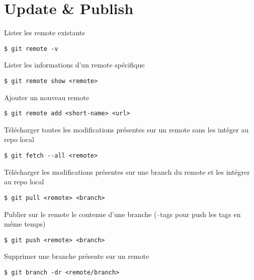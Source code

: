 \section*{Update \& Publish}

Lister les remote existants
\begin{lstlisting}
$ git remote -v
\end{lstlisting} 
Lister les informations d'un remote spécifique
\begin{lstlisting}
$ git remote show <remote>
\end{lstlisting}
Ajouter un nouveau remote
\begin{lstlisting}
$ git remote add <short-name> <url>
\end{lstlisting}
Télécharger toutes les modifications présentes sur un remote sans les intéger au repo local
\begin{lstlisting}
$ git fetch --all <remote>
\end{lstlisting}
Télécharger les modifications présentes sur une branch du remote et les intégrer au repo local
\begin{lstlisting}
$ git pull <remote> <branch>
\end{lstlisting}
Publier sur le remote le contenue d'une branche (--tags pour push les tags en même temps)
\begin{lstlisting}
$ git push <remote> <branch> 
\end{lstlisting}
Supprimer une branche présente sur un remote
\begin{lstlisting}
$ git branch -dr <remote/branch>
\end{lstlisting}